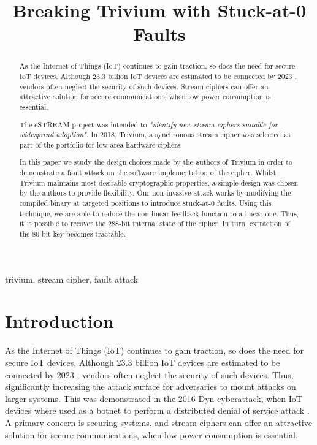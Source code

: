 \documentclass[conference]{IEEEtran}
\begin{document}
\title{Breaking Trivium with Stuck-at-0 Faults}

\author{
}

\maketitle

\begin{abstract}
As the Internet of Things (IoT) continues to gain traction, so does the need for secure IoT devices. Although 23.3 billion IoT devices are estimated to be connected by 2023 \cite{iot}, vendors often neglect the security of such devices. Stream ciphers can offer an attractive solution for secure communications, when low power consumption is essential. 

The eSTREAM project was intended to \textit{"identify new stream ciphers suitable for widespread adoption"}.\cite{call} In 2018, Trivium, a synchronous stream cipher was selected as part of the portfolio for low area hardware ciphers. 

In this paper we study the design choices made by the authors of Trivium in order to demonstrate a fault attack on the software implementation of the cipher. Whilst Trivium maintains most desirable cryptographic properties, a simple design was chosen by the authors to provide flexibility. Our non-invasive attack works by modifying the compiled binary at targeted positions to introduce stuck-at-0 faults. Using this technique, we are able to reduce the non-linear feedback function to a linear one. Thus, it is possible to recover the 288-bit internal state of the cipher. In turn, extraction of the 80-bit key becomes tractable.
\end{abstract}

\begin{IEEEkeywords}
trivium, stream cipher, fault attack
\end{IEEEkeywords}

\section{Introduction}
As the Internet of Things (IoT) continues to gain traction, so does the need for secure IoT devices. Although 23.3 billion IoT devices are estimated to be connected by 2023 \cite{iot}, vendors often neglect the security of such devices. Thus, significantly increasing the attack surface for adversaries to mount attacks on larger systems. This was demonstrated in the 2016 Dyn cyberattack, when IoT devices where used as a botnet to perform a distributed denial of service attack \cite{dyn}. A primary concern is securing systems, and stream ciphers can offer an attractive solution for secure communications, when low power consumption is essential.
\end{document}
